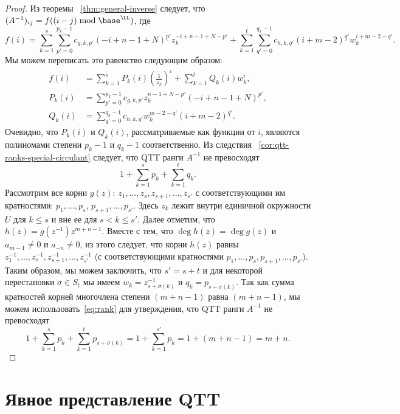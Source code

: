 \begin{proof}
	Из теоремы ~\ref{thm:general-inverse} следует, что $(A^{-1})_{ij} = f((i-j) \bmod \base^\LL)$, где
	\[
	f(i) = 
	\sum_{k=1}^s\sum_{p'=0}^{p_k-1}
	c_{g,k,p'}
	(-i+n-1+N)^{\underline{p}'} z_k^{-i+n-1+N-p'}
	+
	\sum_{k=1}^t\sum_{q'=0}^{q_k-1}
	c_{h,k,q'}
	(i+m-2)^{\underline{q}'}w_k^{i+m-2-q'}.
	\]
	Мы можем переписать это равенство следующим образом:
	\begin{align*}
	f(i) &= 
	\sum_{k=1}^sP_k(i)\left(\frac{1}{z_k}\right)^{i}
	+
	\sum_{k=1}^tQ_k(i)w_k^{i},\\
	P_k(i) &= 
	\sum_{p'=0}^{p_k-1}
	c_{g,k,p'}
	z_k^{n-1+N-p'}
	(-i+n-1+N)^{\underline{p}'}, \\
	Q_k(i) &=
	\sum_{q'=0}^{q_k-1}
	c_{h,k,q'}
	w_k^{m-2-q'}
	(i+m-2)^{\underline{q}'}.
	\end{align*}
	Очевидно, что $P_k(i)$ и $Q_k(i)$, рассматриваемые как функции от $i$, являются полиномами степени $p_k-1$ и $q_k-1$ соответственно.
	Из следствия ~\ref{cor:qtt-ranks-special-circulant} следует, что QTT ранги $A^{-1}$ не превосходят
	\begin{equation}\label{eq:rank}
	1 + \sum_{k=1}^s p_k + \sum_{k=1}^t q_k.    
	\end{equation}
	Рассмотрим все корни $g(z)$: $z_1, \dots, z_s, z_{s+1}, \dots, z_{s'}$ с соответствующими им кратностями: $p_1, \dots, p_s$, $p_{s+1}, \dots, p_{s'}$.
	Здесь $z_k$ лежит внутри единичной окружности $U$ для $k \le s$ и вне ее для $s < k \le s'$.
	Далее отметим, что $h(z) = g(z^{-1})z^{m+n-1}$.
	Вместе с тем, что $\deg h(z) = \deg g(z)$ и $a_{m-1} \neq 0$ и $a_{-n} \neq 0$, из этого следует, что корни $h(z)$ равны $z_1^{-1}, \dots, z_s^{-1}, z_{s+1}^{-1}, \dots, z_{s'}^{-1}$ (с соответствующими кратностями $p_1, \dots, p_s, p_{s+1}, \dots, p_{s'}$).
	Таким образом, мы можем заключить, что $s' = s + t$ и для некоторой перестановки $\sigma \in S_t$ мы имеем $w_{k} = z_{s+\sigma(k)}^{-1}$ и $q_k = p_{s+\sigma(k)}$.
	Так как сумма кратностей корней многочлена степени $(m + n -1)$ равна $(m+n-1)$, мы можем использовать~\eqref{eq:rank} для утверждения, что QTT ранги $A^{-1}$ не превосходят
	\[
	1 + \sum_{k=1}^s p_k + \sum_{k=1}^t p_{s+\sigma(k)}
	=
	1 + \sum_{k=1}^{s'} p_k = 1 + (m+n-1) = m+n. 
	\]
\end{proof}

\section{Явное представление QTT} \label{sec:qtt_repr}

